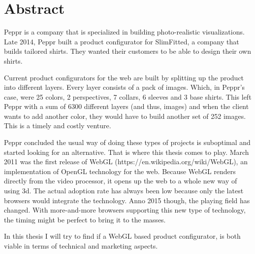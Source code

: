 \chapter*{Abstract}%

Peppr is a company that is specialized in building photo-realistic visualizations. Late 2014, Peppr built a product configurator for SlimFitted, a company that builds tailored shirts. They wanted their customers to be able to design their own shirts. 

Current product configurators for the web are built by splitting up the product into different layers. Every layer consists of a pack of images. Which, in Peppr's case, were 25 colors, 2 perspectives, 7 collars, 6 sleeves and 3 base shirts. This left Peppr with a sum of 6300 different layers (and thus, images) and when the client wants to add another color, they would have to build another set of 252 images. This is a timely and costly venture.

Peppr concluded the usual way of doing these types of projects is suboptimal and started looking for an alternative. That is where this thesis comes to play. March 2011 was the first release of WebGL (https://en.wikipedia.org/wiki/WebGL), an implementation of OpenGL technology for the web. Because WebGL renders directly from the video processor, it opens up the web to a whole new way of using 3d. The actual adoption rate has always been low because only the latest browsers would integrate the technology. Anno 2015 though, the playing field has changed. With more-and-more browsers supporting this new type of technology, the timing might be perfect to bring it to the masses.

In this thesis I will try to find if a WebGL based product configurator, is both viable in terms of technical and marketing aspects.